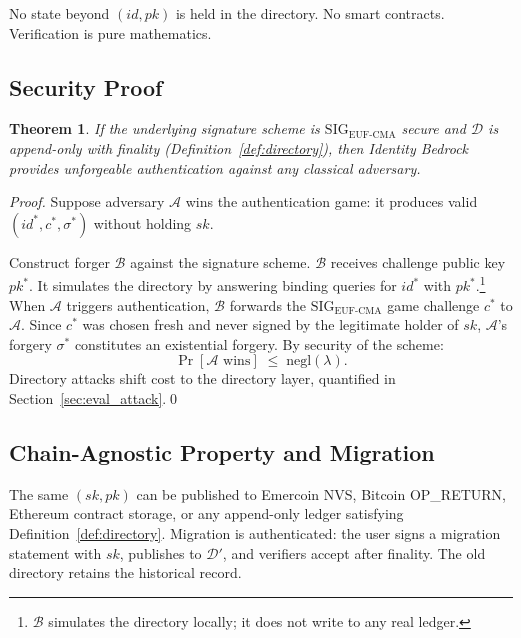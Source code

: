 \documentclass[11pt,a4paper]{article}
\newtheorem{theorem}{Theorem}[section]
\theoremstyle{definition}
\newcommand{\SIG}{\mathrm{SIG}}
\newcommand{\EUFCMA}{\mathrm{EUF\text{-}CMA}}
\newcommand{\negl}{\mathrm{negl}}
\newcommand{\BD}{\textsf{Identity Bedrock}}
\begin{document}
No state beyond $(\mathit{id}, \mathit{pk})$ is held in the directory.
No smart contracts. Verification is pure mathematics.

\subsection{Security Proof}

\begin{theorem}
\label{thm:unforgeability}
If the underlying signature scheme is $\SIG_{\EUFCMA}$ secure and
$\mathcal{D}$ is append-only with finality
(Definition~\ref{def:directory}), then \BD{} provides unforgeable
authentication against any classical adversary.
\end{theorem}

\begin{proof}
Suppose adversary $\mathcal{A}$ wins the authentication game: it
produces valid $(\mathit{id}^*, c^*, \sigma^*)$ without holding
$\mathit{sk}$.

Construct forger $\mathcal{B}$ against the signature scheme.
$\mathcal{B}$ receives challenge public key $\mathit{pk}^*$. It
simulates the directory by answering binding queries for
$\mathit{id}^*$ with $\mathit{pk}^*$.\footnote{$\mathcal{B}$
simulates the directory locally; it does not write to any real
ledger.} When $\mathcal{A}$ triggers authentication, $\mathcal{B}$
forwards the $\SIG_{\EUFCMA}$ game challenge $c^*$ to $\mathcal{A}$.
Since $c^*$ was chosen fresh and never signed by the legitimate
holder of $\mathit{sk}$, $\mathcal{A}$'s forgery $\sigma^*$
constitutes an existential forgery. By security of the scheme:
\[
  \Pr[\mathcal{A}\text{ wins}] \;\leq\; \negl(\lambda).
\]
Directory attacks shift cost to the directory layer, quantified in
Section~\ref{sec:eval_attack}.\hfill\qed
\end{proof}

\subsection{Chain-Agnostic Property and Migration}

The same $(\mathit{sk}, \mathit{pk})$ can be published to Emercoin
NVS, Bitcoin OP\_RETURN, Ethereum contract storage, or any
append-only ledger satisfying Definition~\ref{def:directory}.
Migration is authenticated: the user signs a migration statement with
$\mathit{sk}$, publishes to $\mathcal{D}'$, and verifiers accept
after finality. The old directory retains the historical record.
\end{document}
